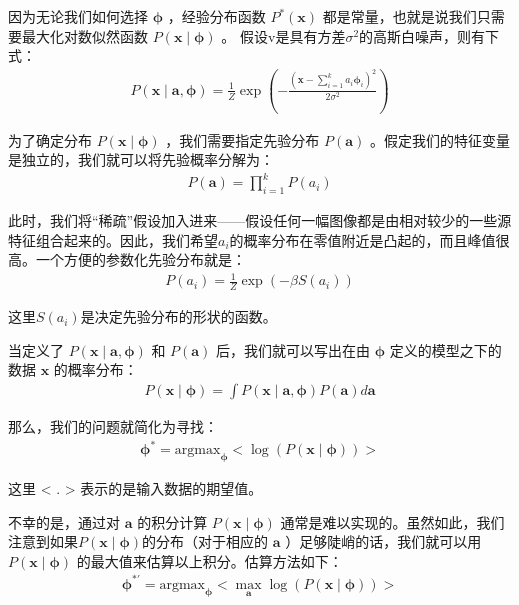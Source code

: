 因为无论我们如何选择 $\mathbf{\phi}$ ，经验分布函数 $P^*(\mathbf{x})$ 都是常量，也就是说我们只需要最大化对数似然函数 $P(\mathbf{x}\mid\mathbf{\phi})$ 。 假设v是具有方差$\sigma^2$的高斯白噪声，则有下式：
\begin{align}
P(\mathbf{x} \mid \mathbf{a}, \mathbf{\phi}) = \frac{1}{Z} \exp\left(- \frac{(\mathbf{x}-\sum^{k}_{i=1} a_i \mathbf{\phi}_{i})^2}{2\sigma^2}\right)
\end{align}

为了确定分布 $P(\mathbf{x}\mid\mathbf{\phi})$ ，我们需要指定先验分布 $P(\mathbf{a})$ 。假定我们的特征变量是独立的，我们就可以将先验概率分解为：
\begin{align}
P(\mathbf{a}) = \prod_{i=1}^{k} P(a_i)
\end{align}

此时，我们将“稀疏”假设加入进来——假设任何一幅图像都是由相对较少的一些源特征组合起来的。因此，我们希望$a_i$的概率分布在零值附近是凸起的，而且峰值很高。一个方便的参数化先验分布就是：
\begin{align}
P(a_i) = \frac{1}{Z}\exp(-\beta S(a_i))
\end{align}

这里$S(a_i)$是决定先验分布的形状的函数。

当定义了 $P(\mathbf{x} \mid \mathbf{a} , \mathbf{\phi})$ 和  $P(\mathbf{a})$ 后，我们就可以写出在由 $\mathbf{\phi}$ 定义的模型之下的数据 $\mathbf{x}$ 的概率分布：
\begin{align}
P(\mathbf{x} \mid \mathbf{\phi}) = \int P(\mathbf{x} \mid \mathbf{a}, \mathbf{\phi}) P(\mathbf{a}) d\mathbf{a}
\end{align}

那么，我们的问题就简化为寻找：
\begin{align}
\mathbf{\phi}^*=\text{argmax}_{\mathbf{\phi}} < \log(P(\mathbf{x} \mid \mathbf{\phi})) >
\end{align}

这里 < . > 表示的是输入数据的期望值。

不幸的是，通过对 $\mathbf{a}$ 的积分计算 $P(\mathbf{x} \mid \mathbf{\phi})$ 通常是难以实现的。虽然如此，我们注意到如果$ P(\mathbf{x} \mid \mathbf{\phi}) $的分布（对于相应的 $\mathbf{a}$ ）足够陡峭的话，我们就可以用$ P(\mathbf{x} \mid \mathbf{\phi})$ 的最大值来估算以上积分。估算方法如下：
\begin{align}
\mathbf{\phi}^{*'}=\text{argmax}_{\mathbf{\phi}} < \max_{\mathbf{a}} \log(P(\mathbf{x} \mid \mathbf{\phi})) >
\end{align}

